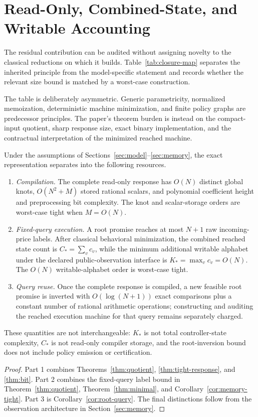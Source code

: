 \section{Read-Only, Combined-State, and Writable Accounting}\label{sec:closure-map}
The residual contribution can be audited without assigning novelty to the classical reductions on which it builds. Table~\ref{tab:closure-map} separates the inherited principle from the model-specific statement and records whether the relevant size bound is matched by a worst-case construction.



The table is deliberately asymmetric. Generic parametricity, normalized memoization, deterministic machine minimization, and finite policy graphs are predecessor principles. The paper's theorem burden is instead on the compact-input quotient, sharp response size, exact binary implementation, and the contractual interpretation of the minimized reached machine.

\begin{proposition}\label{prop:three-layer-accounting}
Under the assumptions of Sections~\ref{sec:model}--\ref{sec:memory}, the exact representation separates into the following resources.
\begin{enumerate}
\item \emph{Compilation.} The complete read-only response has $O(N)$ distinct global knots, $O(N^2+M)$ stored rational scalars, and polynomial coefficient height and preprocessing bit complexity. The knot and scalar-storage orders are worst-case tight when $M=O(N)$.
\item \emph{Fixed-query execution.} A root promise reaches at most $N+1$ raw incoming-price labels. After classical behavioral minimization, the combined reached state count is $C_*=\sum_v c_v$, while the minimum additional writable alphabet under the declared public-observation interface is $K_*=\max_v c_v=O(N)$. The $O(N)$ writable-alphabet order is worst-case tight.
\item \emph{Query reuse.} Once the complete response is compiled, a new feasible root promise is inverted with $O(\log(N+1))$ exact comparisons plus a constant number of rational arithmetic operations; constructing and auditing the reached execution machine for that query remains separately charged.
\end{enumerate}
These quantities are not interchangeable: $K_*$ is not total controller-state complexity, $C_*$ is not read-only compiler storage, and the root-inversion bound does not include policy emission or certification.
\end{proposition}
\begin{proof}
Part 1 combines Theorems~\ref{thm:quotient}, \ref{thm:tight-response}, and \ref{thm:bit}. Part 2 combines the fixed-query label bound in Theorem~\ref{thm:quotient}, Theorem~\ref{thm:minimal}, and Corollary~\ref{cor:memory-tight}. Part 3 is Corollary~\ref{cor:root-query}. The final distinctions follow from the observation architecture in Section~\ref{sec:memory}.
\end{proof}

